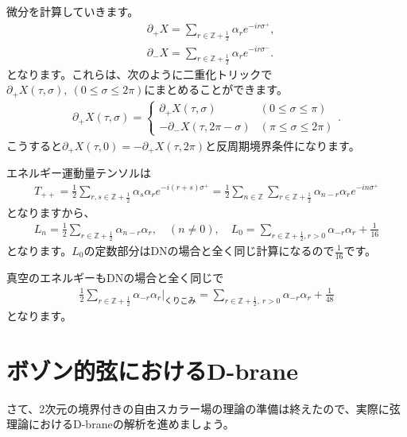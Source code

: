 \documentclass[report,paper=a4, fontsize=12pt, line_length=16cm, number_of_lines=33,dvipdfmx]{jlreq}
\numberwithin{equation}{chapter}
\numberwithin{equation}{section}
\newcommand{\Zb}{\mathbb{Z}}
\newcommand{\del}{\partial}
\newcommand{\Zbh}{\Zb+\frac12}
\begin{document}
微分を計算していきます。
\begin{align}
  &\del_{+}X=\sum_{r\in \Zbh}\alpha_{r}e^{-ir\sigma^{+}},\\
  &\del_{-}X=\sum_{r\in \Zbh}\alpha_{r}e^{-ir\sigma^{-}}.
\end{align}
となります。これらは、次のように二重化トリックで$\del_{+}X(\tau,\sigma),\ (0\le \sigma \le 2\pi)$にまとめることができます。
\begin{align}
  \del_{+}X(\tau,\sigma)=
  \begin{cases}
    \del_{+}X(\tau,\sigma)& (0\le \sigma \le \pi)\\
    -\del_{-}X(\tau,2\pi-\sigma) & (\pi\le \sigma \le 2\pi)
  \end{cases}.
\end{align}
こうすると$\del_{+}X(\tau,0)=-\del_{+}X(\tau,2\pi)$と反周期境界条件になります。

エネルギー運動量テンソルは
\begin{align}
  T_{++}
  =\frac12 \sum_{r,s\in \Zbh}\alpha_{s}\alpha_{r} e^{-i(r+s)\sigma^{+}}
  =\frac12 \sum_{n\in\Zb}\sum_{r\in \Zbh}\alpha_{n-r}\alpha_{r} e^{-in\sigma^{+}}
\end{align}
となりますから、
\begin{align}
  L_{n}=\frac12 \sum_{r\in \Zbh}
  \alpha_{n-r}\alpha_{r},\quad (n\ne 0),\quad
  L_{0}=\sum_{r\in \Zbh,r>0}\alpha_{-r}\alpha_{r}+\frac{1}{16}
\end{align}
となります。$L_0$の定数部分はDNの場合と全く同じ計算になるので$\frac{1}{16}$です。

真空のエネルギーもDNの場合と全く同じで
\begin{align}
  \frac12 \sum_{r\in \Zbh}\alpha_{-r}\alpha_{r}\Bigg|_{\text{くりこみ}}
  =
  \sum_{r\in \Zbh,\ r>0}\alpha_{-r}\alpha_{r}
  +\frac{1}{48}
\end{align}
となります。

\section{ボゾン的弦におけるD-brane}
さて、2次元の境界付きの自由スカラー場の理論の準備は終えたので、実際に弦理論におけるD-braneの解析を進めましょう。
\end{document}
